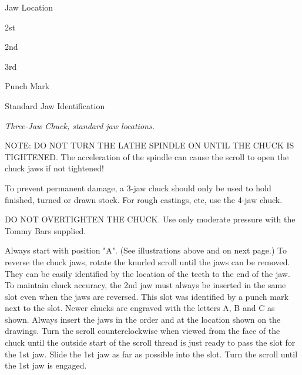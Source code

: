 Jaw Location

2st

2nd

3rd

Punch Mark

Standard Jaw Identification
\bigskip

\textit{Three-Jaw Chuck, standard jaw locations.}
\bigskip


NOTE: DO NOT TURN THE LATHE SPINDLE ON UNTIL THE CHUCK IS TIGHTENED. The
acceleration of the spindle can cause the scroll to open the chuck jaws if not
tightened!

To prevent permanent damage, a 3-jaw chuck should only be used to hold finished,
turned or drawn stock. For rough castings, etc, use the 4-jaw chuck.

DO NOT OVERTIGHTEN THE CHUCK. Use only moderate pressure with the Tommy Bars
supplied.


Always start with position "A". (See illustrations above and on next page.) To
reverse the chuck jaws, rotate the knurled scroll until the jaws can be removed.
They can be easily identified by the location of the teeth to the end of the
jaw. To maintain chuck accuracy, the 2nd jaw must always be inserted in the same
slot even when the jaws are reversed. This slot was identified by a punch mark
next to the slot. Newer chucks are engraved with the letters A, B and C as
shown. Always insert the jaws in the order and at the location shown on the
drawings. Turn the scroll counterclockwise when viewed from the face of the
chuck until the outside start of the scroll thread is just ready to pass the
slot for the 1st jaw. Slide the 1st jaw as far as possible into the slot. Turn
the scroll until the 1st jaw is engaged.

\secup

\secup

\secup
